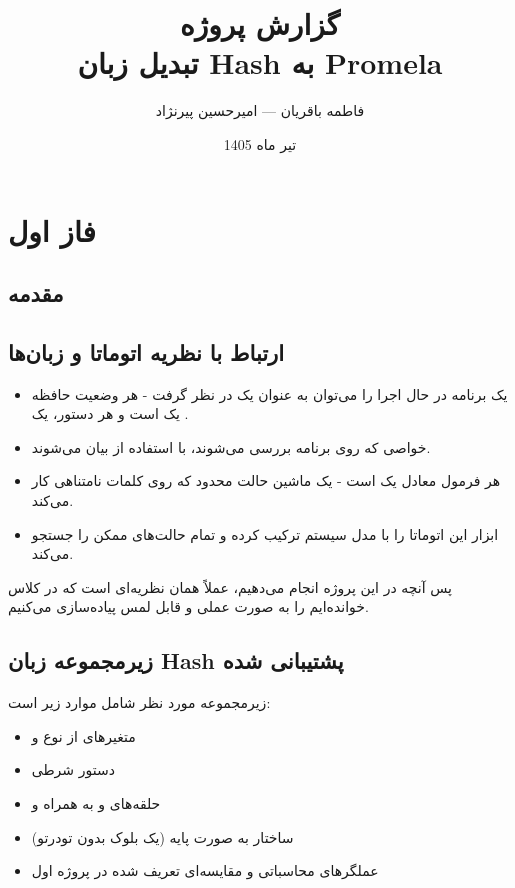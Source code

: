 \documentclass[12pt]{report}
\title{گزارش پروژه \\ تبدیل زبان Hash به Promela}
\author{فاطمه باقریان --- امیرحسین پیرنژاد}
\date{تیر ماه 1405}
\begin{document}
	
	\maketitle
	\tableofcontents
	\newpage
	
	\chapter*{فاز اول}
	
	\section{مقدمه}
	
	\section{ارتباط با نظریه اتوماتا و زبان‌ها}
	
	\begin{itemize}
		\item یک برنامه در حال اجرا را می‌توان به عنوان یک  در نظر گرفت - هر وضعیت حافظه یک  است و هر دستور، یک .
		\item خواصی که روی برنامه بررسی می‌شوند، با استفاده از  بیان می‌شوند.
		\item هر فرمول  معادل یک  است - یک ماشین حالت محدود که روی کلمات نامتناهی کار می‌کند.
		\item ابزار  این اتوماتا را با مدل سیستم ترکیب کرده و تمام حالت‌های ممکن را جستجو می‌کند.
	\end{itemize}
	
	پس آنچه در این پروژه انجام می‌دهیم، عملاً همان نظریه‌ای است که در کلاس خوانده‌ایم را به صورت عملی و قابل لمس پیاده‌سازی می‌کنیم.
	
	\section{زیرمجموعه زبان Hash پشتیبانی شده}
	
	زیرمجموعه مورد نظر شامل موارد زیر است:
	
	\begin{itemize}
		\item متغیرهای از نوع  و 
		\item دستور شرطی 
		\item حلقه‌های  و  به همراه  و 
		\item ساختار  به صورت پایه (یک بلوک  بدون تودرتو)
		\item عملگرهای محاسباتی و مقایسه‌ای تعریف شده در پروژه اول
	\end{itemize}
	
\end{document}

